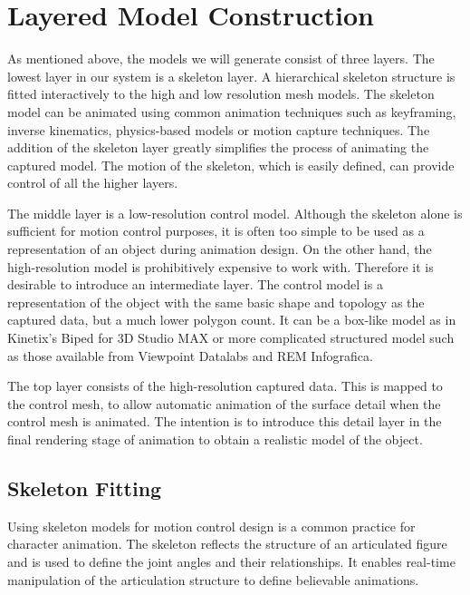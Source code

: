 \documentclass[10pt,oneside,fleqn,a4paper]{book}
\begin{document}
\section{\label{sec:chainmodeling}Layered Model Construction}
As mentioned above, the models we will generate consist of three layers. The lowest layer in our system is a skeleton layer. A hierarchical skeleton structure is fitted interactively to the high and low resolution mesh models. The skeleton model can be animated using common animation techniques such as keyframing, inverse kinematics, physics-based models or motion capture techniques. The addition of the skeleton layer greatly simplifies the process of animating the captured model. The motion of the skeleton, which is easily defined, can provide control of all the higher layers.

The middle layer is a low-resolution control model. Although the skeleton alone is sufficient for motion control purposes, it is often too simple to be used as a representation of an object during animation design. On the other hand, the high-resolution model is prohibitively expensive to work with. Therefore it is desirable to introduce an intermediate layer. The control model is a representation of the object with the same basic shape and topology as the captured data, but a much lower polygon count. It can be a box-like model as in Kinetix's Biped for 3D Studio MAX or more complicated structured model such as those available from Viewpoint Datalabs and REM Infografica.

The top layer consists of the high-resolution captured data. This is mapped to the control mesh, to allow automatic animation of the surface detail when the control mesh is animated. The intention is to introduce this detail layer in the final rendering stage of animation to obtain a realistic model of the object.

\subsection{\label{sec:chainskeleton}Skeleton Fitting}
Using skeleton models for motion control design is a common practice for character animation. The skeleton reflects the structure of an articulated figure and is used to define the joint angles and their relationships. It enables real-time manipulation of the articulation structure to define believable animations.
\end{document}
